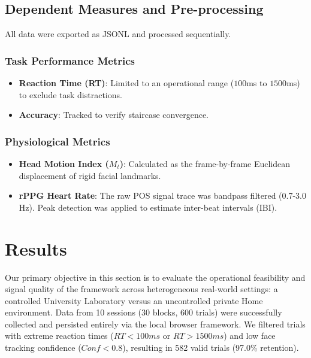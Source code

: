 \documentclass[dvipdfmx]{ehis}
\begin{document}
\subsection{Dependent Measures and Pre-processing}
All data were exported as JSONL and processed sequentially.

\subsubsection{Task Performance Metrics}
\begin{itemize}
    \item \textbf{Reaction Time (RT)}: Limited to an operational range ($100$ms to $1500$ms) to exclude task distractions.
    \item \textbf{Accuracy}: Tracked to verify staircase convergence.
\end{itemize}

\subsubsection{Physiological Metrics}
\begin{itemize}
    \item \textbf{Head Motion Index ($M_t$)}: Calculated as the frame-by-frame Euclidean displacement of rigid facial landmarks.
    \item \textbf{rPPG Heart Rate}: The raw POS signal trace was bandpass filtered (0.7-3.0 Hz). 
Peak detection was applied to estimate inter-beat intervals (IBI).
\end{itemize}

\section{Results}

Our primary objective in this section is to evaluate the operational feasibility and signal quality of the framework across heterogeneous real-world settings: a controlled University Laboratory versus an uncontrolled private Home environment. 
Data from 10 sessions (30 blocks, 600 trials) were successfully collected and persisted entirely via the local browser framework.
We filtered trials with extreme reaction times ($RT < 100ms$ or $RT > 1500ms$) and low face tracking confidence ($Conf < 0.8$), resulting in 582 valid trials (97.0\% retention).
\end{document}
